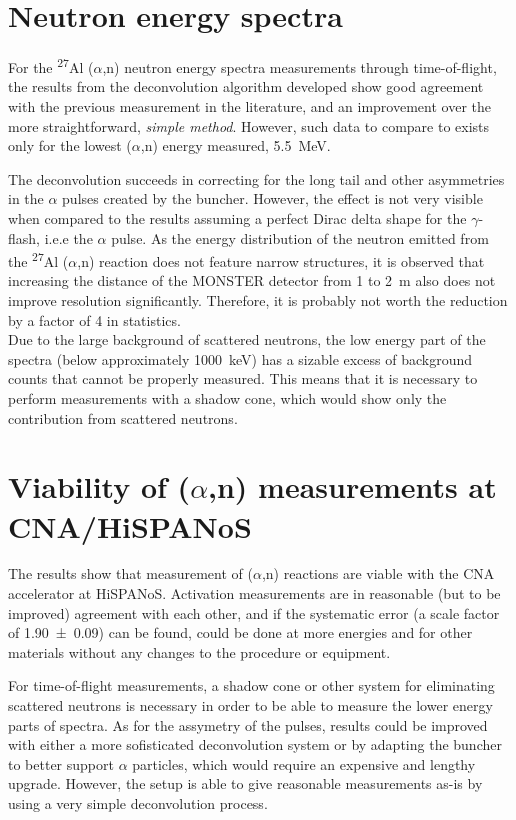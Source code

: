 \documentclass[a4paper,12pt]{report}
\newcommand{\an}{($\alpha$,n) }
\newcommand{\Aliso}{\textsuperscript{27}Al }
\begin{document}
\section{Neutron energy spectra}
For the \Aliso\an neutron energy spectra measurements through time-of-flight, the results from the deconvolution algorithm developed show good agreement with the previous measurement in the literature, and an improvement over the more straightforward, \textit{simple method}.
However, such data to compare to exists only for the lowest \an energy measured, \qty{5.5}{\MeV}.

The deconvolution succeeds in correcting for the long tail and other asymmetries in the $\alpha$ pulses created by the buncher.
However, the effect is not very visible when compared to the results assuming a perfect Dirac delta shape for the $\gamma$-flash, i.e.e the $\alpha$ pulse.
As the energy distribution of the neutron emitted from the \Aliso\an reaction does not feature narrow structures, it is observed that increasing the distance of the MONSTER detector from 1 to \qty{2}{\m} also does not improve resolution significantly.
Therefore, it is probably not worth the reduction by a factor of 4 in statistics.
\\

Due to the large background of scattered neutrons, the low energy part of the spectra (below approximately \qty{1000}{\keV}) has a sizable excess of background counts that cannot be properly measured.
This means that it is necessary to perform measurements with a shadow cone, which would show only the contribution from scattered neutrons.

\section{Viability of \an measurements at CNA/HiSPANoS}
The results show that measurement of \an reactions are viable with the CNA accelerator at HiSPANoS.
Activation measurements are in reasonable (but to be improved) agreement with each other, and if the systematic error (a scale factor of \num{1.90(9)}) can be found, could be done at more energies and for other materials without any changes to the procedure or equipment.

For time-of-flight measurements, a shadow cone or other system for eliminating scattered neutrons is necessary in order to be able to measure the lower energy parts of spectra.
As for the assymetry of the pulses, results could be improved with either a more sofisticated deconvolution system or by adapting the buncher to better support $\alpha$ particles, which would require an expensive and lengthy upgrade.
However, the setup is able to give reasonable measurements as-is by using a very simple deconvolution process.
\end{document}
